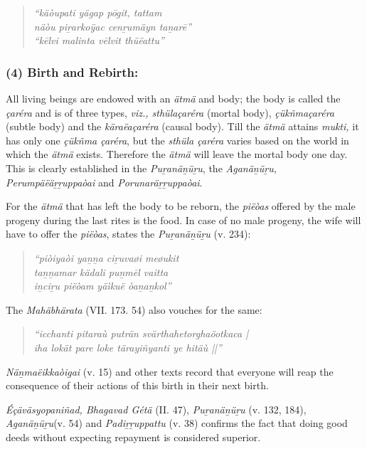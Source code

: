 \begin{verse}
\textit{“käòupati yägap pōgit, tattam}\\\textit{näòu piṟarkoÿac cenṟumäyn taṉarē”}\\\textit{“kēlvi malinta vēlvit thüëattu”}
\end{verse}



\subsubsection*{(4) Birth and Rebirth:}

All living beings are endowed with an \textit{ätmä} and body; the body is called the \textit{çaréra} and is of three types, \textit{viz., sthülaçaréra} (mortal body), \textit{çükñmaçaréra} (subtle body) and the \textit{käraëaçaréra} (causal body). Till the \textit{ätmä} attains \textit{mukti,} it has only one \textit{çükñma çaréra}, but the \textit{sthüla çaréra} varies based on the world in which the \textit{ätmä} exists. Therefore the \textit{ätmä} will leave the mortal body one day. This is clearly established in the \textit{Puṟanäṉüṟu}, the \textit{Aganäṉüṟu, Perumpäëäṟṟuppaòai} and \textit{Porunaräṟṟuppaòai}.

For the \textit{ätmä} that has left the body to be reborn, the \textit{piëòas} offered by the male progeny during the last rites is the food. In case of no male progeny, the wife will have to offer the \textit{piëòas}, states the \textit{Puṟanäṉüṟu} (v. 234):

\begin{verse}
\textit{“piòiyaòi yaṉṉa ciṟuvaøi meøukit}\\\textit{taṉṉamar kädali puṉmēl vaitta}\\\textit{iṉciṟu piëòam yäìkuë òaṉaṉkol”}
\end{verse}

The \textit{Mahäbhärata} (VII. 173. 54) also vouches for the same:

\begin{verse}
\textit{“icchanti pitaraù puträn svärthahetorghaöotkaca |}\\\textit{iha lokät pare loke tärayiñyanti ye hitäù ||”}
\end{verse}

\textit{Näṉmaëikkaòigai} (v. 15) and other texts record that everyone will reap the consequence of their actions of this birth in their next birth.

\textit{Éçäväsyopaniñad, Bhagavad Gétä} (II. 47), \textit{Puṟanäṉüṟu} (v. 132, 184), \textit{Aganäṉüṟu}(v. 54) and \textit{Padiṟṟuppattu} (v. 38) confirms the fact that doing good deeds without expecting repayment is considered superior.

